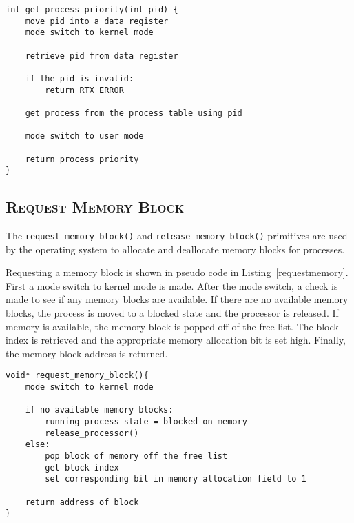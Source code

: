 \documentclass[oneside]{report}
\begin{document}
\begin{lstlisting}
int get_process_priority(int pid) {
    move pid into a data register
    mode switch to kernel mode

    retrieve pid from data register
    
    if the pid is invalid:
        return RTX_ERROR

    get process from the process table using pid
    
    mode switch to user mode

    return process priority
}
\end{lstlisting}

\subsection{\textsc{Request Memory Block}}
The \texttt{request\_memory\_block()} and \texttt{release\_memory\_block()}
primitives are used by the operating system to allocate and deallocate memory
blocks for processes.

Requesting a memory block is shown in pseudo code in
Listing~\ref{requestmemory}. First a mode switch to kernel mode is made. After
the mode switch, a check is made to see if any memory blocks are available. If
there are no available memory blocks, the process is moved to a blocked state
and the processor is released. If memory is available, the memory block is
popped off of the free list. The block index is retrieved and the appropriate memory
allocation bit is set high. Finally, the memory block address is returned.

\begin{lstlisting}
void* request_memory_block(){
    mode switch to kernel mode

    if no available memory blocks:
        running process state = blocked on memory
        release_processor()
    else:
        pop block of memory off the free list        
        get block index
        set corresponding bit in memory allocation field to 1

    return address of block
}
\end{lstlisting}
\end{document}
